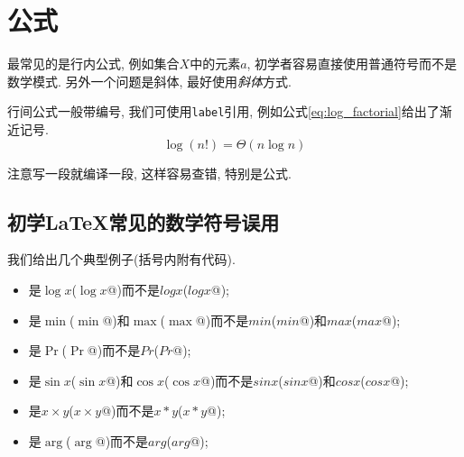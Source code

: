 \chapter{公式}

  最常见的是行内公式, 例如集合$X$中的元素$a$, 初学者容易直接使用普通符号而不是数学模式.
另外一个问题是斜体, 最好使用\emph{斜体}方式.

  行间公式一般带编号, 我们可使用\texttt{label}引用, 例如公式\ref{eq:log_factorial}给出了渐近记号.
\begin{equation}
\label{eq:log_factorial}
\log(n!) = \Theta(n\log{n})
\end{equation}

  注意写一段就编译一段, 这样容易查错, 特别是公式.

\section{初学\LaTeX{}常见的数学符号误用}

  我们给出几个典型例子(括号内附有代码).
\begin{itemize}
  \item 是$\log{x}$(\verb@$\log{}x$@)而不是$log x$(\verb@$log x$@);
  \item 是$\min$(\verb@$\min$@)和$\max$(\verb@$\max$@)而不是$min$(\verb@$min$@)和$max$(\verb@$max$@);
  \item 是$\Pr$(\verb@$\Pr$@)而不是$Pr$(\verb@$Pr$@);
  \item 是$\sin{x}$(\verb@$\sin{}x$@)和$\cos{x}$(\verb@$\cos{}x$@)而不是$sin{x}$(\verb@$sin x$@)和$cos x$(\verb@$cos{x}$@);
  \item 是$x \times y$(\verb@$x \times y$@)而不是$x * y$(\verb@$x * y$@);
  \item 是$\arg$(\verb@$\arg$@)而不是$arg$(\verb@$arg$@);
\end{itemize}
